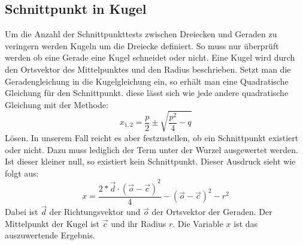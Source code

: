 \documentclass[final,a4paper,11pt,notitlepage,halfparskip]{scrreprt}
\begin{document}
\subsection{Schnittpunkt in Kugel}
Um die Anzahl der Schnittpunkttests zwischen Dreiecken und Geraden zu veringern
werden Kugeln um die Dreiecke definiert. So muss nur überprüft werden ob eine
Gerade eine Kugel schneidet oder nicht. Eine Kugel wird durch den Ortsvektor des
Mittelpunktes und den Radius beschrieben. Setzt man die Geradengleichung in die
Kugelgleichung ein, so erhält man eine Quadratische Gleichung für den
Schnittpunkt. diese lässt sich wie jede andere quadratische Gleichung mit der
Methode:
$$x_{1,2} = \frac{p}{2} \pm \sqrt{\frac{p^2}{4} - q}$$ 
Lösen. In unserem Fall reicht es aber festzustellen, ob ein Schnittpunkt
existiert oder nicht. Dazu muss lediglich der Term unter der Wurzel ausgewertet
werden. Ist dieser kleiner null, so existiert kein Schnittpunkt. Dieser Ausdruck
sieht wie folgt aus:
$$x = \frac{ {2 * \vec{d} \cdot (\vec{o} - \vec{c})}^2 }{4} - {(\vec{o} -
\vec{c})}^2 - r^2$$
Dabei ist $\vec{d}$ der Richtungsvektor und $\vec{o}$ der Ortsvektor der
Geraden. Der Mittelpunkt der Kugel ist $\vec{c}$ und ihr Radius $r$. Die
Variable $x$ ist das auszuwertende Ergebnis.
\end{document}
